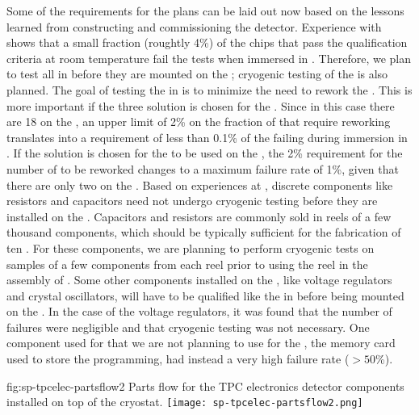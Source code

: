 Some of the requirements for the  plans can
be laid out now based on the lessons learned
from constructing and commissioning the 
detector. Experience with  shows that a small fraction
(roughtly \num{4}\%) of the  chips that pass the
qualification criteria at room temperature fail the tests
when immersed in \lntwo. Therefore, we plan to test all  in \lntwo
before they are mounted on the ; 
cryogenic testing of the  is also planned. The goal of testing 
the  in \lntwo is to minimize the need
to rework the . This is more important if 
the three  solution is chosen for the
. Since in this case there are 18  on the
, an upper limit of 2\% on the fraction of
 that require reworking translates into a requirement 
of less than 0.1\% of the  failing during immersion in \lntwo.
If the  solution is chosen for the 
to be used on the , the 2\% requirement for the
number of  to be reworked changes to a 
maximum failure rate of 1\%, given that there are only two
 on the . Based on experiences at ,
discrete components like resistors and capacitors
need not undergo cryogenic testing before they are installed
on the . Capacitors and resistors are commonly
sold in reels of a few thousand components, which
should be typically sufficient for the fabrication of ten
. For these components, we are planning to
perform cryogenic tests on samples of a few components
from each reel prior to using the reel in the assembly of
. Some other components installed on
the , like voltage regulators and crystal oscillators, 
will have to be qualified like the 
in \lntwo before being mounted on the . In the
case of the voltage regulators, it was found that the number
of failures were negligible and that cryogenic testing was
not necessary. One component used for 
that we are not planning to use for the   ,
the memory card used to store the  programming,
had instead a very high failure rate ($>50$\%).

\begin{dunefigure}
{fig:sp-tpcelec-partsflow2}
{Parts flow for the TPC electronics detector components installed on top of the cryostat.}
\texttt{[image: sp-tpcelec-partsflow2.png]}
\end{dunefigure}

